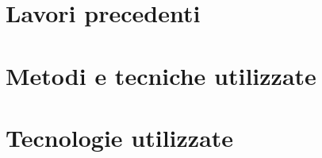 


\section{Lavori precedenti}







\section{Metodi e tecniche utilizzate}

%
%


\section{Tecnologie utilizzate}

%
%

